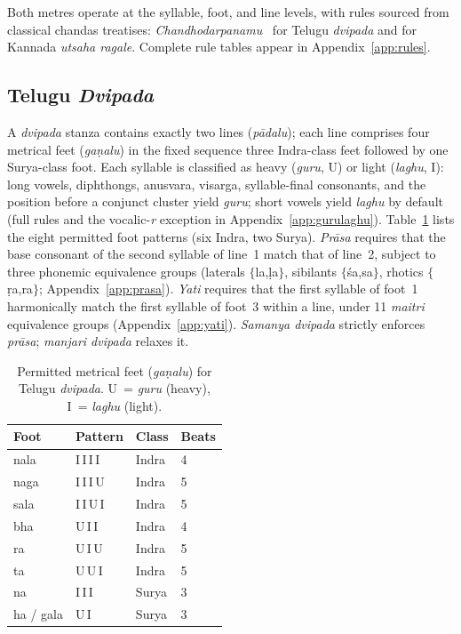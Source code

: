 \documentclass[11pt]{article}
\begin{document}
Both metres operate at the syllable, foot, and line levels, with rules
sourced from classical chandas treatises:
\textit{Chandhodarpanamu}~\citep{chandhodarpanamu} for Telugu
\textit{dvipada} and \citet{venkatachalashastri2008} for Kannada
\textit{utsaha ragale}. Complete rule tables appear in
Appendix~\ref{app:rules}.

\subsection{Telugu \textit{Dvipada}}
\label{sec:dvipada_prosody}

A \textit{dvipada} stanza contains exactly two lines
(\textit{p\={a}dalu}); each line comprises four metrical feet
(\textit{ga\d{n}alu}) in the fixed sequence three Indra-class feet
followed by one Surya-class foot. Each syllable is classified as heavy
(\textit{guru}, U) or light (\textit{laghu}, I): long vowels,
diphthongs, anusvara, visarga, syllable-final consonants, and the
position before a conjunct cluster yield \textit{guru}; short vowels
yield \textit{laghu} by default (full rules and the vocalic-\textit{r}
exception in Appendix~\ref{app:gurulaghu}).
Table~\ref{tab:ganas} lists the eight permitted foot patterns
(six Indra, two Surya). \textit{Pr\={a}sa} requires that the base
consonant of the second syllable of line~1 match that of line~2,
subject to three phonemic equivalence groups (laterals
$\{$la,\d{l}a$\}$, sibilants $\{$\'{s}a,sa$\}$, rhotics
$\{$\d{r}a,ra$\}$; Appendix~\ref{app:prasa}). \textit{Yati} requires
that the first syllable of foot~1 harmonically match the first
syllable of foot~3 within a line, under 11 \textit{maitri} equivalence
groups (Appendix~\ref{app:yati}). \textit{Samanya dvipada} strictly
enforces \textit{pr\={a}sa}; \textit{manjari dvipada} relaxes it.

\begin{table}[h]
\centering
\small
\caption{Permitted metrical feet (\textit{ga\d{n}alu}) for Telugu
\textit{dvipada}. U~= \textit{guru} (heavy), I~= \textit{laghu} (light).}
\label{tab:ganas}
\begin{tabular}{llll}
\toprule
\textbf{Foot} & \textbf{Pattern} & \textbf{Class} & \textbf{Beats} \\
\midrule
nala      & I\,I\,I\,I & Indra & 4 \\
naga      & I\,I\,I\,U & Indra & 5 \\
sala      & I\,I\,U\,I & Indra & 5 \\
bha       & U\,I\,I    & Indra & 4 \\
ra        & U\,I\,U    & Indra & 5 \\
ta        & U\,U\,I    & Indra & 5 \\
\midrule
na        & I\,I\,I    & Surya & 3 \\
ha / gala & U\,I       & Surya & 3 \\
\bottomrule
\end{tabular}
\end{table}
\end{document}
